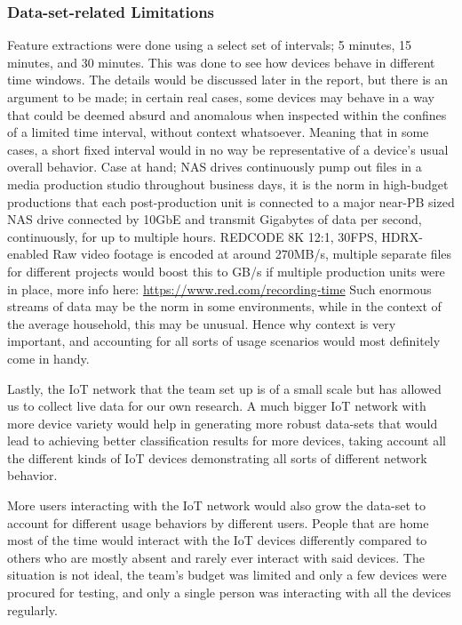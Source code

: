 \documentclass{article}
\begin{document}
\subsubsection{Data-set-related Limitations}
Feature extractions were done using a select set of intervals; 5
minutes, 15 minutes, and 30 minutes. This was done to see how devices
behave in different time windows. The details would be discussed later
in the report, but there is an argument to be made; in certain real cases,
some devices may behave in a way that could be deemed absurd and anomalous when inspected within the confines of a limited time
interval, without context whatsoever. Meaning that in some cases, a short fixed interval would in no way be representative of
a device's usual overall behavior. Case at hand; NAS drives continuously pump out
files in a media production studio throughout business days, it is the
norm in high-budget productions that each post-production unit is
connected to a major near-PB sized NAS drive connected by 10GbE and
transmit Gigabytes of data per second, continuously, for up to multiple hours. REDCODE 8K 12:1, 30FPS, HDRX-enabled Raw video
footage is encoded at around 270MB/s, multiple separate files for different projects would boost this to GB/s if multiple production units were in place, more info here: \url{https://www.red.com/recording-time}\newline
Such enormous streams of data may be the norm in some environments, while in the context of the average household, this may be unusual. Hence why context is very important, and accounting for all sorts of usage scenarios would most definitely come in handy.\newline

Lastly, the IoT network that the team set up is of a small scale but has
allowed us to collect live data for our own research. A much bigger IoT
network with more device variety would help in generating more robust
data-sets that would lead to achieving better classification results for
more devices, taking account all the different kinds of IoT devices
demonstrating all sorts of different network behavior.\pagebreak

More users interacting with the IoT network would also grow the data-set to account
for different usage behaviors by different users. People that are home
most of the time would interact with the IoT devices differently
compared to others who are mostly absent and rarely ever interact with
said devices. The situation is not ideal, the team's budget was limited
and only a few devices were procured for testing, and only a single
person was interacting with all the devices regularly.\newline
\end{document}
